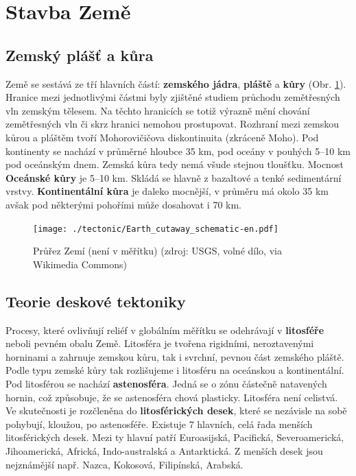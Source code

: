 \section{Stavba Země}

\subsection{Zemský plášť a kůra}
Země se sestává ze tří hlavních částí: \textbf{zemského jádra}, \textbf{pláště} a \textbf{kůry} (Obr. \ref{fig:stavba_zeme}). Hranice mezi jednotlivými částmi byly zjištěné studiem průchodu zemětřesných vln zemským tělesem. Na těchto hranicích se totiž výrazně mění chování zemětřesných vln či skrz hranici nemohou prostupovat. Rozhraní mezi zemskou kůrou a pláštěm tvoří Mohorovičičova diskontinuita (zkráceně Moho). Pod kontinenty se nachází v průměrné hloubce 35 km, pod oceány v pouhých 5--10 km pod oceánským dnem. Zemská kůra tedy nemá všude stejnou tloušťku. Mocnost \textbf{Oceánské kůry} je 5--10 km. Skládá se hlavně z bazaltové a tenké sedimentární vrstvy. \textbf{Kontinentální kůra} je daleko mocnější, v průměru má okolo 35 km avšak pod některými pohořími může dosahovat i 70 km. 

%

\begin{figure}[h]
	\texttt{[image: ./tectonic/Earth\_cutaway\_schematic-en.pdf]}
	\caption{Průřez Zemí (není v měřítku) (zdroj: USGS, volné dílo, via Wikimedia Commons)}
	\label{fig:stavba_zeme}
\end{figure}

\subsection{Teorie deskové tektoniky}
Procesy, které ovlivňují reliéf v globálním měřítku se odehrávají v \textbf{litosféře} neboli pevném obalu Země. Litosféra je tvořena rigidními, neroztavenými horninami a zahrnuje zemskou kůru, tak i svrchní, pevnou část zemského pláště. Podle typu zemské kůry tak rozlišujeme i litosféru na oceánskou a kontinentální. 
Pod litosférou se nachází \textbf{astenosféra}. Jedná se o zónu částečně natavených hornin, což způsobuje, že se astenosféra chová plasticky. 
Litosféra není celistvá. Ve skutečnosti je rozčleněna do \textbf{litosférických desek}, které se nezávisle na sobě pohybují, kloužou, po astenosféře. Existuje 7 hlavních, celá řada menších litosférických desek. Mezi ty hlavní patří Euroasijská, Pacifická, Severoamerická, Jihoamerická, Africká, Indo-australská a Antarktická. Z menších desek jsou nejznámější např. Nazca, Kokosová, Filipínská, Arabská. 

